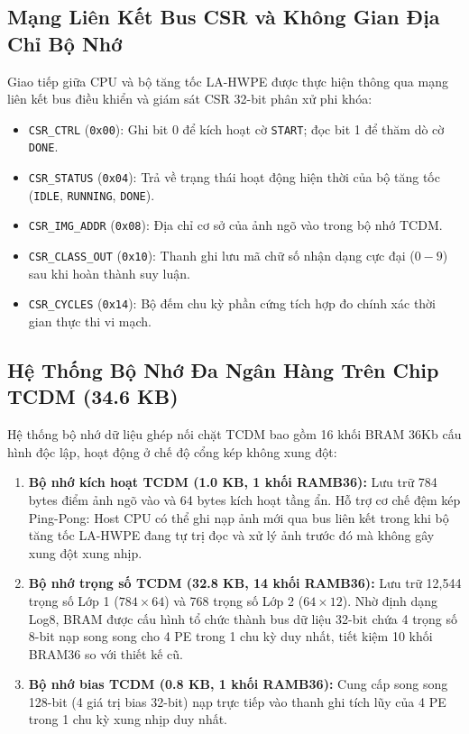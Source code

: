 \documentclass[conference]{IEEEtran}
\begin{document}
\subsection{Mạng Liên Kết Bus CSR và Không Gian Địa Chỉ Bộ Nhớ}
\hspace*{1em} Giao tiếp giữa CPU và bộ tăng tốc LA-HWPE được thực hiện thông qua mạng liên kết bus điều khiển và giám sát CSR 32-bit phân xử phi khóa:
\begin{itemize}
    \item \texttt{CSR\_CTRL} (\texttt{0x00}): Ghi bit 0 để kích hoạt cờ \texttt{START}; đọc bit 1 để thăm dò cờ \texttt{DONE}.
    \item \texttt{CSR\_STATUS} (\texttt{0x04}): Trả về trạng thái hoạt động hiện thời của bộ tăng tốc (\texttt{IDLE}, \texttt{RUNNING}, \texttt{DONE}).
    \item \texttt{CSR\_IMG\_ADDR} (\texttt{0x08}): Địa chỉ cơ sở của ảnh ngõ vào trong bộ nhớ TCDM.
    \item \texttt{CSR\_CLASS\_OUT} (\texttt{0x10}): Thanh ghi lưu mã chữ số nhận dạng cực đại ($0 - 9$) sau khi hoàn thành suy luận.
    \item \texttt{CSR\_CYCLES} (\texttt{0x14}): Bộ đếm chu kỳ phần cứng tích hợp đo chính xác thời gian thực thi vi mạch.
\end{itemize}

\subsection{Hệ Thống Bộ Nhớ Đa Ngân Hàng Trên Chip TCDM (34.6 KB)}
\hspace*{1em} Hệ thống bộ nhớ dữ liệu ghép nối chặt TCDM bao gồm 16 khối BRAM 36Kb cấu hình độc lập, hoạt động ở chế độ cổng kép không xung đột:
\begin{enumerate}
    \item \textbf{Bộ nhớ kích hoạt TCDM (1.0 KB, 1 khối RAMB36):} Lưu trữ 784 bytes điểm ảnh ngõ vào và 64 bytes kích hoạt tầng ẩn. Hỗ trợ cơ chế đệm kép Ping-Pong: Host CPU có thể ghi nạp ảnh mới qua bus liên kết trong khi bộ tăng tốc LA-HWPE đang tự trị đọc và xử lý ảnh trước đó mà không gây xung đột xung nhịp.
    \item \textbf{Bộ nhớ trọng số TCDM (32.8 KB, 14 khối RAMB36):} Lưu trữ 12,544 trọng số Lớp 1 ($784 \times 64$) và 768 trọng số Lớp 2 ($64 \times 12$). Nhờ định dạng Log8, BRAM được cấu hình tổ chức thành bus dữ liệu 32-bit chứa 4 trọng số 8-bit nạp song song cho 4 PE trong 1 chu kỳ duy nhất, tiết kiệm 10 khối BRAM36 so với thiết kế cũ.
    \item \textbf{Bộ nhớ bias TCDM (0.8 KB, 1 khối RAMB36):} Cung cấp song song 128-bit (4 giá trị bias 32-bit) nạp trực tiếp vào thanh ghi tích lũy của 4 PE trong 1 chu kỳ xung nhịp duy nhất.
\end{enumerate}
\end{document}
